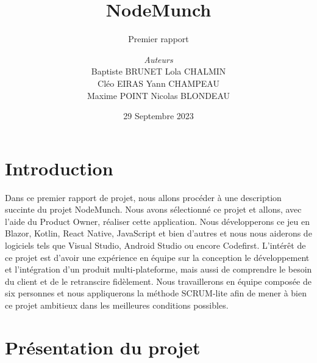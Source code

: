 \documentclass[a4paper, 12pt,table]{report}
\newcommand\tab[1][1cm]{\hspace*{#1}}
\begin{document}



\title{NodeMunch}
\subtitle{Premier rapport}
\author{\textit{Auteurs}\\
  Baptiste \textsc{BRUNET} \tab Lola \textsc{CHALMIN}\\
  Cléo \textsc{EIRAS} \tab \tab Yann \textsc{CHAMPEAU}\\
  \tab Maxime \textsc{POINT} \tab Nicolas \textsc{BLONDEAU}
}
\date{29 Septembre 2023}

\begin{titlepage}
\maketitle
\end{titlepage}



\tableofcontents

\setlength{\parindent}{3ex}



\chapter{Introduction}
Dans ce premier rapport de projet, nous allons procéder à une description succinte du projet NodeMunch. Nous avons sélectionné ce projet et allons, avec l'aide du Product Owner, réaliser cette application. Nous développerons ce jeu en Blazor, Kotlin, React Native, JavaScript et bien d'autres et nous nous aiderons de logiciels tels que Visual Studio, Android Studio ou encore Codefirst. L'intérêt de ce projet est d'avoir une expérience en équipe sur la conception le développement et l'intégration d'un produit multi-plateforme, mais aussi de comprendre le besoin du client et de le retranscire fidèlement. Nous travaillerons en équipe composée de six personnes et nous appliquerons la méthode SCRUM-lite afin de mener à bien ce projet ambitieux dans les meilleures conditions possibles.




\chapter{Présentation du projet}
\end{document}
